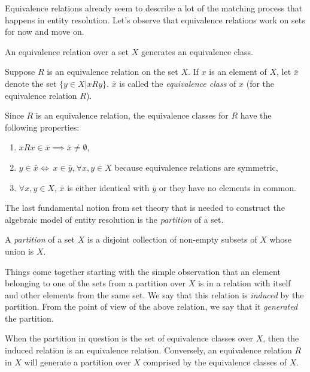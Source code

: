 \documentclass[11pt]{article}
\begin{document}
    Equivalence relations already seem to describe a lot of the matching process
    that happens in entity resolution.
    Let's observe that equivalence relations work on sets for now and move on.

    An equivalence relation over a set $X$ generates an equivalence class.

    \begin{defn}Suppose $R$ is an equivalence relation on the set $X$. If $x$ is
    an element of $X$, let $\bar{x}$ denote the set $\{y \in X | xRy\}$.
    $\bar{x}$ is called the \textit{equivalence class} of $x$ (for the
    equivalence relation $R$)\cite{hoffman1971linear}.
    \end{defn}

    Since $R$ is an equivalence relation, the equivalence classes for $R$ have the
    following properties\cite{hoffman1971linear}:
    \begin{enumerate}
        \item $xRx \in \bar{x} \implies \bar{x} \neq \emptyset$,
        \item $y\in\bar{x}\iff~x\in\bar{y}$,$~\forall x,y \in X$ because
        equivalence relations are symmetric,
        \item $\forall x,y \in X$, $\bar{x}$ is either identical with $\bar{y}$
        or they have no elements in common\cite{hoffman1971linear,Tal11}.
    \end{enumerate}
    
    The last fundamental notion from set theory that is needed to construct the
    algebraic model of entity resolution is the \textit{partition} of a set.

    \begin{defn}
        A \textit{partition} of a set $X$ is a disjoint collection of non-empty
        subsets of $X$ whose union is $X$\cite{halmos1960naive,Tal11}.
    \end{defn}

    Things come together starting with the simple observation that an element
    belonging to one of the sets from a partition over $X$ is in a relation with
    itself and other elements from the same set.
    We say that this relation is \textit{induced} by the partition.
    From the point of view of the above relation, we say that it
    \textit{generated} the partition.

    When the partition in question is the set of equivalence classes over $X$,
    then the induced relation is an equivalence relation.
    Conversely, an equivalence relation $R$ in $X$ will generate a partition
    over $X$ comprised by the equivalence classes of $X$\cite{halmos1960naive,
    Tal11}.
\end{document}
